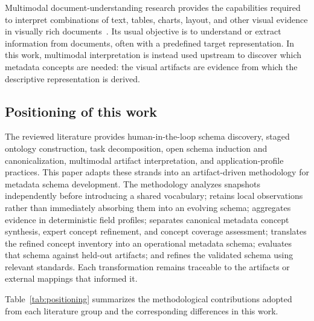 \documentclass{article}
\begin{document}
Multimodal document-understanding research provides the capabilities required to interpret combinations of text, tables, charts, layout, and other visual evidence in visually rich documents~\citep{wang2025,ding2026vrdu}. Its usual objective is to understand or extract information from documents, often with a predefined target representation. In this work, multimodal interpretation is instead used upstream to discover which metadata concepts are needed: the visual artifacts are evidence from which the descriptive representation is derived.

\subsection{Positioning of this work}

The reviewed literature provides human-in-the-loop schema discovery, staged ontology construction, task decomposition, open schema induction and canonicalization, multimodal artifact interpretation, and application-profile practices. This paper adapts these strands into an artifact-driven methodology for metadata schema development. The methodology analyzes snapshots independently before introducing a shared vocabulary; retains local observations rather than immediately absorbing them into an evolving schema; aggregates evidence in deterministic field profiles; separates canonical metadata concept synthesis, expert concept refinement, and concept coverage assessment; translates the refined concept inventory into an operational metadata schema; evaluates that schema against held-out artifacts; and refines the validated schema using relevant standards. Each transformation remains traceable to the artifacts or external mappings that informed it.

Table~\ref{tab:positioning} summarizes the methodological contributions adopted from each literature group and the corresponding differences in this work.
\end{document}
